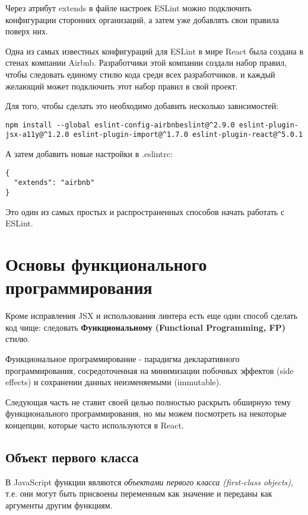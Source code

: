 Через атрибут extends в файле настроек ESLint можно подключить конфигурации сторонних организаций, а затем уже добавлять свои правила поверх них.

Одна из самых известных конфигураций для ESLint в мире React была создана в стенах компании Airbnb. Разработчики этой компании создали набор правил, чтобы следовать единому стилю кода среди всех разработчиков, и каждый желающий может подключить этот набор правил в свой проект.

Для того, чтобы сделать это необходимо добавить несколько зависимостей:

\begin{lstlisting}
npm install --global eslint-config-airbnbeslint@^2.9.0 eslint-plugin-jsx-a11y@^1.2.0 eslint-plugin-import@^1.7.0 eslint-plugin-react@^5.0.1
\end{lstlisting}

А затем добавить новые настройки в .eslintrc:

\begin{lstlisting}
{
  "extends": "airbnb"
}
\end{lstlisting}

Это один из самых простых и распространенных способов начать работать с ESLint.


\section{Основы функционального программирования}

Кроме исправления JSX и использования линтера есть еще один способ сделать код чище: следовать \textbf{Функциональному (Functional Programming, FP)} стилю.

Функциональное программирование - парадигма декларативного программирования, сосредоточенная на минимизации побочных эффектов (side effects) и сохранении данных неизменяемыми (immutable).

Следующая часть не ставит своей целью полностью раскрыть обширную тему функционального программирования, но мы можем посмотреть на некоторые концепции, которые часто используются в React. 

\subsection*{Объект первого класса}

В JavaScript функции являются \textit{объектами первого класса (first-class objects)}, т.е. они могут быть присвоены переменным как значение и переданы как аргументы другим функциям.

